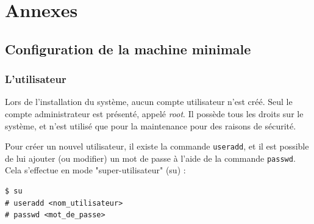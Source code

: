 \cleardoublepage



\chapter*{Annexes}


\section{Configuration de la machine minimale}


\subsection{L'utilisateur}

Lors de l'installation du système, aucun compte utilisateur n'est créé.
Seul le compte administrateur est présenté, appelé \textit{root}.
Il possède tous les droits sur le système, et n'est utilisé que pour la maintenance pour des raisons de sécurité.

Pour créer un nouvel utilisateur, il existe la commande \lstinline{useradd}, et il est possible de lui ajouter (ou modifier) un mot de passe à l'aide de la commande \lstinline{passwd}.
Cela s'effectue en mode "super-utilisateur" (su) :
\begin{lstlisting}
$ su
# useradd <nom_utilisateur>
# passwd <mot_de_passe>
\end{lstlisting}
~~\\





